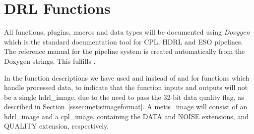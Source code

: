 \clearpage
\section{DRL Functions}\label{sec:drl_functions}


All functions, plugins, macros and data types will be documented using
\emph{Doxygen} which is the standard documentation tool for CPL, HDRL and ESO
pipelines. The reference manual for the pipeline system is created automatically
from the Doxygen strings. This fulfills .

In the function descriptions we have used  and
 instead of  and  for functions which handle
processed data, to
indicate that the function inputs and outputs will not be a single
hdrl\_image, due to the need to pass the 32-bit data quality flag, as
described in Section~\ref{sssec:metisimageformat}.  A metis\_image will
consist of an hdrl\_image and a cpl\_image, containing the DATA and
NOISE extensions, and QUALITY extension, respectively.











